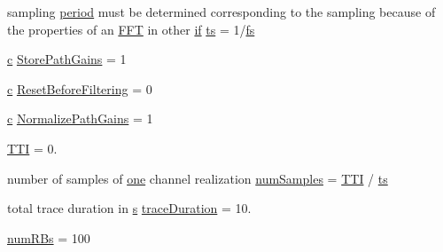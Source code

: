 \begin{DoxyCompactItemize}
\item 
sampling \hyperlink{mmwave_2model_2fading-traces_2fading__trace__generator_8m_ae10c944bf9f3fba2686a5885ecc192d7}{period} must be determined corresponding to the sampling because of the properties of an \hyperlink{mmwave_2model_2fading-traces_2fading__trace__generator_8m_ac4962f4e70dbd9d6f4994fd9698b6932}{F\+FT} in other \hyperlink{loss__OH__large__cities__urban_8m_ac77b6cfa3068152087725fe54b4ae8c8}{if} \hyperlink{lte_2model_2fading-traces_2fading__trace__generator_8m_ada841f58d7be618bfbc76c87e7d44086}{ts} = 1/\hyperlink{mmwave_2model_2fading-traces_2fading__trace__generator_8m_a828bad5070b721e1b73311b8607e5d25}{fs}
\item 
\hyperlink{mmwave_2model_2fading-traces_2fading__trace__generator_8m_ae0323a9039add2978bf5b49550572c7c}{c} \hyperlink{lte_2model_2fading-traces_2fading__trace__generator_8m_a9dc3a71c2ded9325a6ff7ff3ba9ace9f}{Store\+Path\+Gains} = 1
\item 
\hyperlink{mmwave_2model_2fading-traces_2fading__trace__generator_8m_ae0323a9039add2978bf5b49550572c7c}{c} \hyperlink{lte_2model_2fading-traces_2fading__trace__generator_8m_a3b6959ba3648790623378c52c9cc974a}{Reset\+Before\+Filtering} = 0
\item 
\hyperlink{mmwave_2model_2fading-traces_2fading__trace__generator_8m_ae0323a9039add2978bf5b49550572c7c}{c} \hyperlink{lte_2model_2fading-traces_2fading__trace__generator_8m_a361a4eebc8493db68881255cbd5c8fc3}{Normalize\+Path\+Gains} = 1
\item 
\hyperlink{lte_2model_2fading-traces_2fading__trace__generator_8m_ac1869da1923b6ac2fd774dc4fe76bf1e}{T\+TI} = 0.
\item 
number of samples of \hyperlink{visualizer-ideas_8txt_a0a84c3fa82a58d60404416317320714e}{one} channel realization \hyperlink{lte_2model_2fading-traces_2fading__trace__generator_8m_ac1c1060eccee3f757a797f32214e7725}{num\+Samples} = \hyperlink{mmwave_2model_2fading-traces_2fading__trace__generator_8m_ac1869da1923b6ac2fd774dc4fe76bf1e}{T\+TI} / \hyperlink{mmwave_2model_2fading-traces_2fading__trace__generator_8m_ada841f58d7be618bfbc76c87e7d44086}{ts}
\item 
total trace duration in \hyperlink{generate__test__data__lte__sinr_8m_ad83eeb3a142285d1243a08c6b7026df8}{s} \hyperlink{lte_2model_2fading-traces_2fading__trace__generator_8m_a0c1585818ec8cef3da5de969db327075}{trace\+Duration} = 10.
\item 
\hyperlink{lte_2model_2fading-traces_2fading__trace__generator_8m_a887ee7a54247d19e5e93955a7b9663ae}{num\+R\+Bs} = 100

\end{DoxyCompactItemize}
